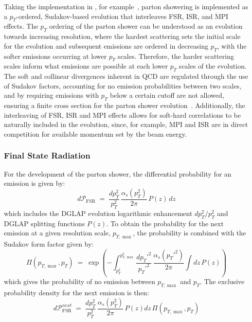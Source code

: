 Taking the implementation in \pythia, for example~\cite{pythia_evolution,Buckley:2011event_generators_lhc}, parton showering is implemented as a $p_T$-ordered, Sudakov-based evolution that interleaves FSR, ISR, and MPI effects. 
The $p_{T}$ ordering of the parton shower can be understood as an evolution towards increasing resolution, where the hardest scattering sets the initial scale for the evolution and subsequent emissions are ordered in decreasing $p_{T}$, with the softer emissions occurring at lower $p_{T}$ scales.
Therefore, the harder scattering scales inform what emissions are possible at each lower $p_{T}$ scales of the evolution. 
The soft and collinear divergences inherent in QCD are regulated through the use of Sudakov factors, accounting for no emission probabilities between two scales, and by requiring emissions with $p_{T}$ below a certain cutoff are not allowed, ensuring a finite cross section for the parton shower evolution~\cite{Buckley:2011event_generators_lhc,Sterman:2022collinear_factorization}.
Additionally, the interleaving of FSR, ISR and MPI effects allows for soft-hard correlations to be naturally included in the evolution, since, for example, MPI and ISR are in direct competition for available momentum set by the beam energy.

\subsubsection{Final State Radiation}
For the development of the parton shower, the differential probability for an emission is given by:
\begin{equation}
d\mathcal{P}_\text{FSR} \;=\; \frac{d p_T^2}{p_T^2}\,\frac{\alpha_s(p_T^2)}{2\pi}\,P(z)\,dz
\end{equation}
which includes the DGLAP evolution logarithmic enhancement $d p_T^2 / p_T^2$ and DGLAP splitting functions $P(z)$. 
To obtain the probability for the next emission at a given resolution scale, $p_{T,\max}$, the probability is combined with the Sudakov form factor given by:
\begin{equation}
\Pi(p_{T,\max}, p_T) \;=\; \exp\!\left(-\int_{p_T^2}^{p_{T,\max}^2} \frac{dp_T'^2}{p_T'^2}\,\frac{\alpha_s(p_T'^2)}{2\pi}\!\int dz\,P(z)\right)
\end{equation}
which gives the probability of no emission between $p_{T,\max}$ and $p_T$.
The exclusive probability density for the next emission is then:
\begin{equation}
d\mathcal{P}^{next}_\text{FSR} \;=\; \frac{d p_T^2}{p_T^2}\,\frac{\alpha_s(p_T^2)}{2\pi}\,P(z)dz\,\Pi(p_{T,\max}, p_T)
\end{equation}

